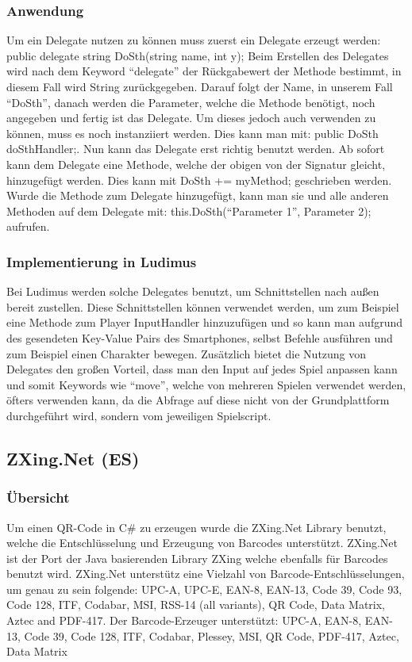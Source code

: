\subsubsection{Anwendung}
Um ein Delegate nutzen zu können muss zuerst ein Delegate erzeugt werden:
\newline
\tab public delegate string DoSth(string name, int y);
\newline
Beim Erstellen des Delegates wird nach dem Keyword “delegate” der Rückgabewert der Methode bestimmt, in diesem Fall wird String zurückgegeben. Darauf folgt der Name, in unserem Fall “DoSth”, danach werden die Parameter, welche die Methode benötigt, noch angegeben und fertig ist das Delegate. Um dieses jedoch auch verwenden zu können, muss es noch instanziiert werden. Dies kann man mit: public DoSth doSthHandler;. Nun kann das Delegate erst richtig benutzt werden. Ab sofort kann dem Delegate eine Methode, welche der obigen von der Signatur gleicht, hinzugefügt werden. Dies kann mit DoSth += myMethod; geschrieben werden. Wurde die Methode zum Delegate hinzugefügt, kann man sie und alle anderen Methoden auf dem Delegate mit: this.DoSth(“Parameter 1”, Parameter 2); aufrufen.
\subsubsection{Implementierung in Ludimus}
Bei Ludimus werden solche Delegates benutzt, um Schnittstellen nach außen bereit zustellen. Diese Schnittstellen können verwendet werden, um zum Beispiel eine Methode zum Player InputHandler hinzuzufügen und so kann man aufgrund des gesendeten Key-Value Pairs des Smartphones, selbst Befehle ausführen und zum Beispiel einen Charakter bewegen. Zusätzlich bietet die Nutzung von Delegates den großen Vorteil, dass man den Input auf jedes Spiel anpassen kann und somit Keywords wie “move”, welche von mehreren Spielen verwendet werden, öfters verwenden kann, da die Abfrage auf diese nicht von der Grundplattform durchgeführt wird, sondern vom jeweiligen Spielscript.
\subsection{ZXing.Net (ES)}
\subsubsection{Übersicht}
Um einen QR-Code in C\# zu erzeugen wurde die ZXing.Net Library benutzt, welche die Entschlüsselung und Erzeugung von Barcodes unterstützt. ZXing.Net ist der Port der Java basierenden Library ZXing welche ebenfalls für Barcodes benutzt wird.
\newline \newline
ZXing.Net unterstütz eine Vielzahl von Barcode-Entschlüsselungen, um genau zu sein folgende: UPC-A, UPC-E, EAN-8, EAN-13, Code 39, Code 93, Code 128, ITF, Codabar, MSI, RSS-14 (all variants), QR Code, Data Matrix, Aztec and PDF-417.
\newline \newline
Der Barcode-Erzeuger unterstützt: UPC-A, EAN-8, EAN-13, Code 39, Code 128, ITF, Codabar, Plessey, MSI, QR Code, PDF-417, Aztec, Data Matrix
